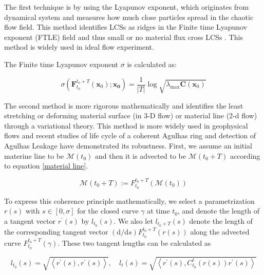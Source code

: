 The first technique is by using the Lyapunov exponent, which originates from dynamical system and measures how much close particles spread in the chaotic flow field. This method identifies LCSs as ridges in the Finite time Lyapunov exponent (FTLE) field and thus small or no material flux cross LCSs \cite{shadden2005definition, haller2001distinguished,haller2002lagrangian,haller2011lagrangian}. This method is widely used in ideal flow experiment.

The Finite time Lyapunov exponent $ \sigma $ is calculated as:

\begin{equation}
    \sigma\left(\mathbf{F}_{t_{0}}^{t_{0}+T}\left(\mathbf{x}_{0}\right) ; \mathbf{x}_{\mathbf{0}}\right)=\frac{1}{|T|} \log \sqrt{\lambda_{\max }\mathbf{C}\left(\mathbf{x}_{0}\right)}
\end{equation}

The second method is more rigorous mathematically and identifies the least stretching or deforming material surface (in 3-D flow) or material line (2-d flow) through a variational theory\cite{blazevski2014hyperbolic,haller2011variational,haller2012geodesic}. This method is more widely used in geophysical flows and recent studies of life cycle of a coherent Agulhas ring and detection of Agulhas Leakage have demonstrated its robustness\cite{wang2015identification,wang2016life,beron2013objective}. 
First, we assume an initial materine line to be $\mathcal{M}(t_0)$ and then it is advected to be $\mathcal{M}(t_0+T)$ according to equation \ref{material line}.

\begin{equation}
    \mathcal{M}(t_0+T):=F_{t_{0}}^{t_0+T}\left(\mathcal{M}\left(t_{0}\right)\right)
    \label{material line}
\end{equation}

To express this coherence principle mathematically, we select a parametrization $r(s)$ with $s \in[0, \sigma]$ for the closed curve $\gamma$ at time $t_{0}$, and denote the length of a tangent vector $r^{\prime}(s)$ by $l_{t_{0}}(s)$. We also let $l_{t_0+T}(s)$ denote the length of the corresponding tangent vector $(\mathrm{d} / \mathrm{d} s) F_{t_{0}}^{t_0+T}(r(s))$ along the advected curve $F_{t_{0}}^{t_0+ T}(\gamma) .$ These two tangent lengths can be calculated as

\begin{equation}
    l_{t_{0}}(s)=\sqrt{\left\langle r^{\prime}(s), r^{\prime}(s)\right\rangle}, \quad l_{t}(s)=\sqrt{\left\langle r^{\prime}(s), C_{t_{0}}^{t}(r(s)) r^{\prime}(s)\right\rangle}
\end{equation}

